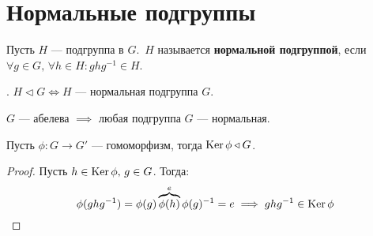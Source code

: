 \documentclass[../main.tex]{subfiles}
\begin{document}
\section{Нормальные подгруппы}
\begin{definition}
    Пусть $H$ --- подгруппа в $G$.\, $H$ называется \textbf{нормальной подгруппой}, если $\forall g \in G, \, \forall h \in H\colon ghg^{-1} \in H$.
\end{definition}
. $H \triangleleft G \iff H$ --- нормальная подгруппа $G$.
\begin{remark}
    $G$ --- абелева $\implies$ любая подгруппа $G$ --- нормальная.
\end{remark}

\begin{theorem-non}
    Пусть $\phi\colon G \to G'$ --- гомоморфизм, тогда $\operatorname{Ker} \phi \triangleleft G$.
\end{theorem-non}
\begin{proof}
    Пусть $h \in \operatorname{Ker} \phi, \, g \in G$. Тогда:
    \begin{equation*}
        \phi(ghg^{-1}) = \phi(g) \overbrace{\phi(h)}^{\mathclap{e}} \phi(g)^{-1} = e
        \implies ghg^{-1} \in \Ker \phi
    \end{equation*}
\end{proof}
\end{document}

